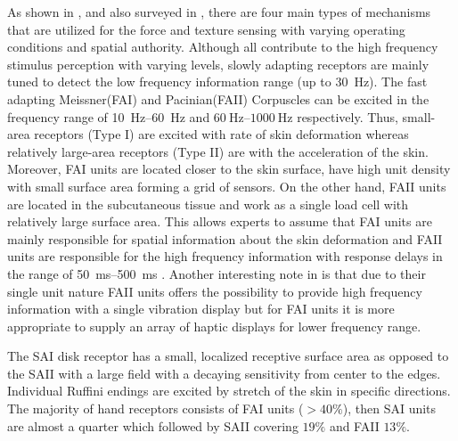 As shown in , and also surveyed in \cite{kontarinis}, there are four main types of mechanisms that are utilized for the force and texture sensing with varying operating conditions and spatial authority. Although all contribute to the high frequency stimulus perception with varying levels, slowly adapting receptors are mainly tuned to detect the low frequency information range (up to \SI{30}{\hertz}). The fast adapting Meissner(FAI) and Pacinian(FAII) Corpuscles can be excited in the frequency range of \SIrange{10}{60}{\hertz} and $\SIrange{60}{1000}{\hertz}$ respectively. Thus, small-area receptors (Type I) are excited with rate of skin deformation whereas relatively large-area receptors (Type II) are with the acceleration of the skin. Moreover, FAI units are located closer to the skin surface, have high unit density with small surface area forming a grid of sensors. On the other hand, FAII units are located in the subcutaneous tissue and work as a single load cell with relatively large surface area. This allows experts to assume that FAI units are mainly responsible for spatial information about the skin deformation and FAII units are responsible for the high frequency information with response delays in the range of \SIrange{50}{500}{\milli\second} \cite{idareview}. Another interesting note in \cite{kontarinis} is that due to their single unit nature FAII units offers the possibility to provide high frequency information with a single vibration display but for FAI units it is more appropriate to supply an array of haptic displays for lower frequency range.  

The SAI disk receptor has a small, localized receptive surface area as opposed to the SAII with a large field with a decaying sensitivity from center to the edges. Individual Ruffini endings are excited by stretch of the skin in specific directions. The majority of hand receptors consists of FAI units ($>40\%$), then SAI units are almost a quarter which followed by SAII covering $19\%$ and FAII $13\%$. 



